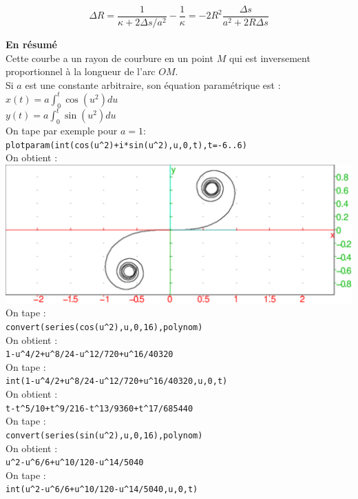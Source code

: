 \documentclass[a4paper,11pt]{book}
\begin{document}
    $$\Delta R = \frac{1}{\kappa + 2 \Delta s / a^2} - \frac{1}{\kappa} = - 2 R^2 \frac{\Delta s}{a^2 + 2 R \Delta s}$$

{\bf En r\'esum\'e}\\
Cette courbe a un rayon de courbure en un point $M$ qui est inversement 
proportionnel \`a la longueur de l'arc $OM$.\\
Si $a$ est une constante arbitraire, son \'equation param\'etrique est :\\
$x(t)=a\int_0^t \cos(u^2)du$\\
$y(t)=a\int_0^t \sin(u^2)du$\\
On tape par exemple pour $a=1$:\\
{\tt plotparam(int(cos(u\verb|^|2)+i*sin(u\verb|^|2),u,0,t),t=-6..6)}\\
On obtient :\\
\includegraphics[width=\textwidth]{spiralclotho2}\\
On tape :\\
{\tt convert(series(cos(u\verb|^|2),u,0,16),polynom)}\\
On obtient :\\
{\tt 1-u\verb|^|4/2+u\verb|^|8/24-u\verb|^|12/720+u\verb|^|16/40320}\\
On tape :\\
{\tt int(1-u\verb|^|4/2+u\verb|^|8/24-u\verb|^|12/720+u\verb|^|16/40320,u,0,t)}\\
On obtient :\\
{\tt t-t\verb|^|5/10+t\verb|^|9/216-t\verb|^|13/9360+t\verb|^|17/685440}\\
On tape :\\
{\tt convert(series(sin(u\verb|^|2),u,0,16),polynom)}\\
On obtient :\\
{\tt u\verb|^|2-u\verb|^|6/6+u\verb|^|10/120-u\verb|^|14/5040}\\
On tape :\\
{\tt int(u\verb|^|2-u\verb|^|6/6+u\verb|^|10/120-u\verb|^|14/5040,u,0,t)}\\
\end{document}
